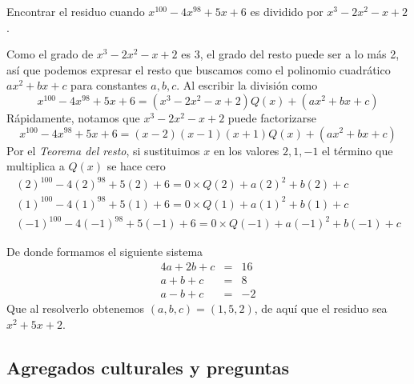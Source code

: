 \begin{section-example.tcb}
    Encontrar el residuo cuando $x^{100} - 4x^{98} + 5x + 6$ es dividido por $x^3 - 2x^2 - x + 2$.
\end{section-example.tcb}
\begin{solution}
    Como el grado de $x^3 - 2x^2 - x + 2$ es 3, el grado del resto puede ser a lo más 2,
    así que podemos expresar el resto que buscamos como el polinomio cuadrático $ax^2 + bx + c$ para constantes $a, b, c$.
    Al escribir la división como
    \[
        x^{100} - 4x^{98} + 5x + 6 = \left( x^3 - 2x^2 - x + 2 \right)Q(x) + \left( ax^2 + bx + c \right)
    \]
    Rápidamente, notamos que $x^3 - 2x^2 - x + 2$ puede factorizarse
    \[
        x^{100} - 4x^{98} + 5x + 6 = (x - 2)(x - 1)(x + 1)Q(x) + ( ax^2 + bx + c )
    \]
    Por el \textit{Teorema del resto}, si sustituimos $x$ en los valores $2, 1, -1$ el término que multiplica a $Q(x)$ se hace cero
    \begin{gather*}
        (2)^{100} - 4(2)^{98} + 5(2) + 6 = 0\times Q(2) + a(2)^2 + b(2) + c\\
        (1)^{100} - 4(1)^{98} + 5(1) + 6 = 0\times Q(1) + a(1)^2 + b(1) + c\\
        (-1)^{100} - 4(-1)^{98} + 5(-1) + 6 = 0\times Q(-1) + a(-1)^2 + b(-1) + c
    \end{gather*}

    De donde formamos el siguiente sistema
    \[
        \begin{array}{rcl}
            4a + 2b +  c & = & 16\\
            a +  b + c & = & 8\\
            a - b + c & = & -2
        \end{array}
    \]
    Que al resolverlo obtenemos $(a, b, c) = (1, 5, 2)$, de aquí que el residuo sea $\boxed{x^2 + 5x + 2}$.
\end{solution}



\subsection{Agregados culturales y preguntas}

